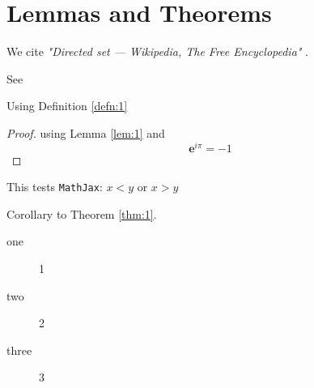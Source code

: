 \section[L and T]{Lemmas and Theorems}

We cite \emph{"Directed set --- {Wikipedia}{,} The Free Encyclopedia"} \cite{enwiki:1103032969}.

\begin{Lem}[A Lemma]\label{lem:1}
  \lipsum[3]

  See \cite{wiki:it:tautol}
\end{Lem}

\begin{Theorem}\label{thm:1}
  Using Definition \ref{defn:1} \\
  \lipsum[4]
  \begin{proof}
    using Lemma \ref{lem:1} and
    \begin{equation}
      \label{eq:1}
      {\mathbf{e}}^{i \pi }=-1
    \end{equation}
  \end{proof}
  This tests \texttt{MathJax}: $x<y$ or $x>y$
\end{Theorem}

\lipsum[5]

\begin{Cor}\label{cor:1}
  Corollary to Theorem \ref{thm:1}.
  \\
  \lipsum[6]
\end{Cor}

\begin{description}
\item[one] 1
\item[two] 2 %
\item[three] 3
\end{description}



